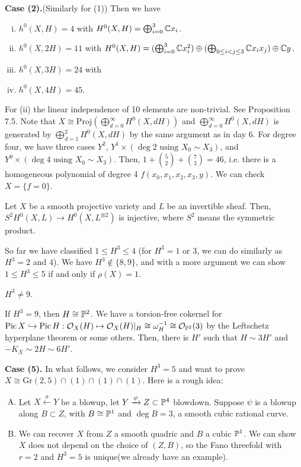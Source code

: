 \documentclass{../../small}
\DeclareMathOperator{\Pic}{Pic}
\begin{document}
\bigskip
\noindent\textbf{Case (2).}(Similarly for (1))
Then we have
\begin{enumerate}[(i)]
\item $h^0(X,H)=4$ with $H^0(X,H)=\bigoplus_{i=0}^3\C x_i$.
\item $h^0(X,2H)=11$ with $H^0(X,H)=(\bigoplus_{i=0}^3\C x_i^2)\oplus(\bigoplus_{0\le i<j\le3}\C x_ix_j)\oplus\C y$.
\item $h^0(X,3H)=24$ with 
\item $h^0(X,4H)=45$.
\end{enumerate}
For (ii) the linear independence of 10 elements are non-trivial.
See Proposition 7.5.
Note that $X\cong\mathrm{Proj}(\bigoplus_{d=0}^\infty H^0(X,dH))$ and $\bigoplus_{d=0}^\infty H^0(X,dH)$ is generated by $\bigoplus_{d=1}^2 H^0(X,dH)$ by the same argument as in day 6.
For degree four, we have three cases $Y^2$, $Y^1\times(\deg 2\text{ using }X_0\sim X_3)$, and $Y^0\times(\deg 4\text{ using }X_0\sim X_3)$.
Then, $1+{5\choose 2}+{7\choose 3}=46$, i.e. there is a homogeneous polynomial of degree 4 $f(x_0,x_1,x_2,x_3,y)$.
We can check $X=\{f=0\}$.

\begin{exe}
Let $X$ be a smooth projective variety and $L$ be an invertible sheaf.
Then, $S^2H^0(X,L)\to H^0(X,L^{\otimes2})$ is injective, where $S^2$ means the symmetric product.
\end{exe}

So far we have classified $1\le H^3\le4$ (for $H^3=1$ or $3$, we can do similarly as $H^3=2$ and $4$).
We have $H^3\notin\{8,9\}$, and with a more argument we can show $1\le H^3\le 5$ if and only if $\rho(X)=1$.

\begin{prop}
$H^3\ne9$.
\end{prop}
\begin{pf}[Sketch]
If $H^3=9$, then $H\cong\P^2$.
We have a torsion-free cokernel for $\Pic X\hookrightarrow\Pic H:\cO_X(H)\mapsto\cO_X(H)|_H\cong\omega_H^{-1}\cong\cO_{\P^2}(3)$ by the Leftschetz hyperplane theorem or some others.
Then, there is $H'$ such that $H\sim 3H'$ and $-K_X\sim 2H\sim 6H'$.
\end{pf}

\bigskip
\noindent\textbf{Case (5).}
In what follows, we consider $H^3=5$ and want to prove $X\cong\mathrm{Gr}(2,5)\cap(1)\cap(1)\cap(1)$.
Here is a rough idea:
\begin{enumerate}[(A)]
\item
Let $X\xleftarrow{\sigma}Y$ be a blowup, let $Y\xrightarrow{\psi}Z\subset\P^4$ blowdown.
Suppose $\psi$ is a blowup along $B\subset Z$, with $B\cong\P^1$ and $\deg B=3$, a smooth cubic rational curve.
\item
We can recover $X$ from $Z$ a smooth quadric and $B$ a cubic $\P^1$.
We can show $X$ does not depend on the choice of $(Z,B)$, so the Fano threefold with $r=2$ and $H^3=5$ is unique(we already have an example).
\end{enumerate}
\end{document}
